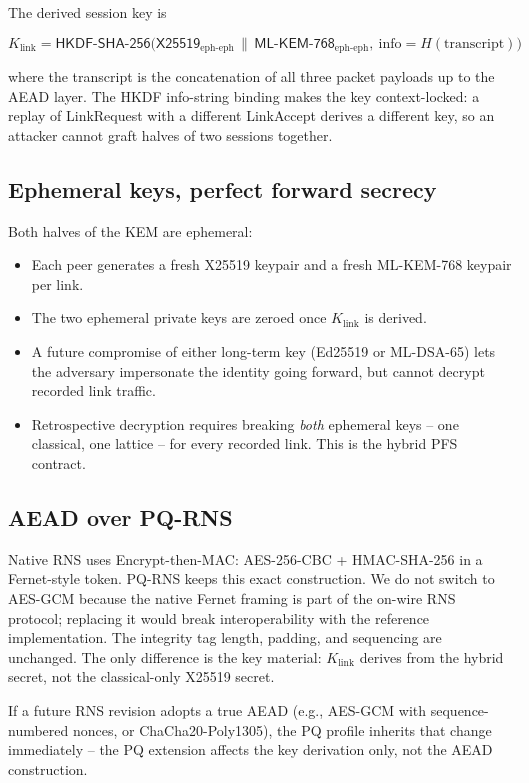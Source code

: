 \documentclass[11pt,a4paper]{article}
\begin{document}
The derived session key is

$$K_\text{link} = \textsf{HKDF-SHA-256}\bigl(
\textsf{X25519}_\text{eph-eph}\,\|\,
\textsf{ML-KEM-768}_\text{eph-eph},\
\text{info}=H(\text{transcript})\bigr)$$

where the transcript is the concatenation of all three packet payloads
up to the AEAD layer. The HKDF info-string binding makes the key
context-locked: a replay of LinkRequest with a different LinkAccept
derives a different key, so an attacker cannot graft halves of two
sessions together.

\subsection{Ephemeral keys, perfect forward secrecy}

Both halves of the KEM are ephemeral:

\begin{itemize}[leftmargin=*,itemsep=0pt]
\item Each peer generates a fresh X25519 keypair and a fresh
  ML-KEM-768 keypair per link.
\item The two ephemeral private keys are zeroed once $K_\text{link}$
  is derived.
\item A future compromise of either long-term key (Ed25519 or
  ML-DSA-65) lets the adversary impersonate the identity going
  forward, but cannot decrypt recorded link traffic.
\item Retrospective decryption requires breaking \emph{both}
  ephemeral keys -- one classical, one lattice -- for every recorded
  link. This is the hybrid PFS contract.
\end{itemize}

\subsection{AEAD over PQ-RNS}

Native RNS uses Encrypt-then-MAC: AES-256-CBC + HMAC-SHA-256 in a
Fernet-style token. PQ-RNS keeps this exact construction. We do not
switch to AES-GCM because the native Fernet framing is part of the
on-wire RNS protocol; replacing it would break interoperability with
the reference implementation. The integrity tag length, padding, and
sequencing are unchanged. The only difference is the key material:
$K_\text{link}$ derives from the hybrid secret, not the classical-only
X25519 secret.

If a future RNS revision adopts a true AEAD (e.g., AES-GCM with
sequence-numbered nonces, or ChaCha20-Poly1305), the PQ profile
inherits that change immediately -- the PQ extension affects the key
derivation only, not the AEAD construction.
\end{document}
